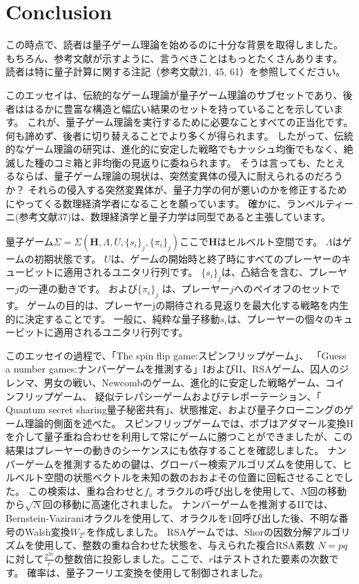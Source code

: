 \section{Conclusion}

この時点で、読者は量子ゲーム理論を始めるのに十分な背景を取得しました。 もちろん、参考文献が示すように、言うべきことはもっとたくさんあります。 読者は特に量子計算に関する注記（参考文献21, 45, 61）を参照してください。

このエッセイは、伝統的なゲーム理論が量子ゲーム理論のサブセットであり、後者ははるかに豊富な構造と幅広い結果のセットを持っていることを示しています。
これが、量子ゲーム理論を実行するために必要なことすべての正当化です。 何も諦めず、後者に切り替えることでより多くが得られます。
したがって、伝統的なゲーム理論の研究は、進化的に安定した戦略でもナッシュ均衡でもなく、絶滅した種のコミ箱と非均衡の見返りに委ねられます。
そうは言っても、たとえるならば、量子ゲーム理論の現状は、突然変異体の侵入に耐えられるのだろうか？
それらの侵入する突然変異体が、量子力学の何が悪いのかを修正するためにやってくる数理経済学者になることを願っています。
確かに、ランベルティーニ(参考文献37)は、数理経済学と量子力学は同型であると主張しています。

量子ゲーム$\Sigma = \Sigma(\mathbf{H}, \Lambda, U, \{ s_i \}_j, \{ \pi_i \}_j  ) $ここで$\mathbf{H}$はヒルベルト空間です。
  $\Lambda$はゲームの初期状態です。
  $U$は、ゲームの開始時と終了時にすべてのプレーヤーのキュービットに適用されるユニタリ行列です。
$ \{ s_i \}_j$は、凸結合を含む、プレーヤー$j$の一連の動きです。 および$ \{ \pi_i \}_j$  は、プレーヤー$j$へのペイオフのセットです。
ゲームの目的は、プレーヤーjの期待される見返りを最大化する戦略を内生的に決定することです。
一般に、純粋な量子移動$s_i$は、プレーヤーの個々のキュービットに適用されるユニタリ行列です。

このエッセイの過程で、「The spin flip game:スピンフリップゲーム」、
「Guess a number games:ナンバーゲームを推測する」IおよびII、RSAゲーム、囚人のジレンマ、男女の戦い、Newcombのゲーム、進化的に安定した戦略ゲーム、コインフリップゲーム、 疑似テレパシーゲームおよびテレポーテーション、「 Quantum secret sharing量子秘密共有」、状態推定、および量子クローニングのゲーム理論的側面を述べた。 スピンフリップゲームでは、ボブはアダマール変換Hを介して量子重ね合わせを利用して常にゲームに勝つことができましたが、この結果はプレーヤーの動きのシーケンスにも依存することを確認しました。 ナンバーゲームを推測するための鍵は、グローバー検索アルゴリズムを使用して、ヒルベルト空間の状態ベクトルを未知の数のおおよその位置に回転させることでした。
この検索は、重ね合わせと$f_a$ オラクルの呼び出しを使用して、$N$回の移動から$\sqrt{N}$回の移動に高速化されました。
ナンバーゲームを推測するIIでは、Bernstein-Vaziraniオラクルを使用して、オラクルを$1$回呼び出した後、不明な番号のWalsh変換$W_{2^n}$を作成しました。
RSAゲームでは、Shorの因数分解アルゴリズムを使用して、整数の重ね合わせた状態を、与えられた複合RSA素数 $N = pq$に対して$\frac{2^{2n}}{r}$の整数倍に投影しました。ここで、$r$はテストされた要素の次数です。
確率は、量子フーリエ変換を使用して制御されました。

